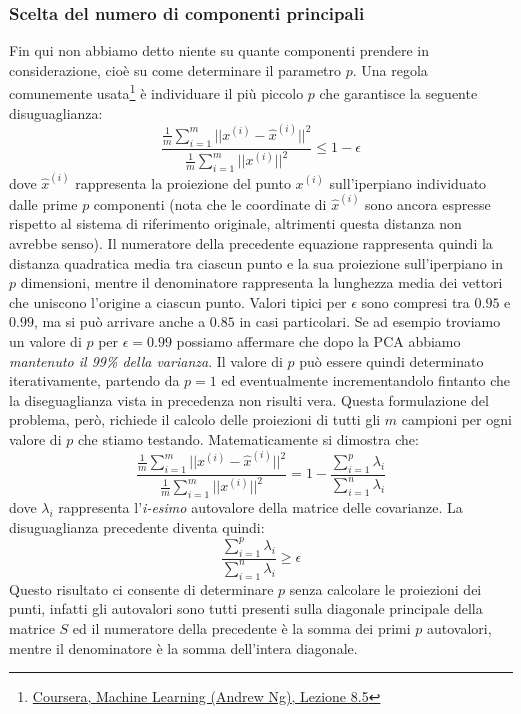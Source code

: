 \subsubsection{Scelta del numero di componenti principali}\label{scelta-p}
Fin qui non abbiamo detto niente su quante componenti prendere in considerazione, cioè su come determinare il parametro $p$. Una regola comunemente usata\footnote{{\href{https://class.coursera.org/ml-005/lecture/86}{Coursera, Machine Learning (Andrew Ng), Lezione 8.5}}} è individuare il più piccolo $p$ che garantisce la seguente disuguaglianza:
\begin{equation*}
\displaystyle\frac{\displaystyle\frac{1}{m} \sum_{i=1}^m || x^{(i)} - \hat{x}^{(i)}||^2}{\displaystyle\frac{1}{m} \sum_{i=1}^m || x^{(i)}||^2} \leq 1-\epsilon
\end{equation*}
dove $\hat{x}^{(i)}$ rappresenta la proiezione del punto $x^{(i)}$ sull'iperpiano individuato dalle prime $p$ componenti (nota che le coordinate di $\hat{x}^{(i)}$ sono ancora espresse rispetto al sistema di riferimento originale, altrimenti questa distanza non avrebbe senso). Il numeratore della precedente equazione rappresenta quindi la distanza quadratica media tra ciascun punto e la sua proiezione sull'iperpiano in $p$ dimensioni, mentre il denominatore rappresenta la lunghezza media dei vettori che uniscono l'origine a ciascun punto. Valori tipici per $\epsilon$ sono compresi tra $0.95$ e $0.99$, ma si può arrivare anche a $0.85$ in casi particolari. Se ad esempio troviamo un valore di $p$ per $\epsilon = 0.99$ possiamo affermare che dopo la PCA abbiamo \emph{mantenuto il 99\% della varianza}.
Il valore di $p$ può essere quindi determinato iterativamente, partendo da $p=1$ ed eventualmente incrementandolo fintanto che la diseguaglianza vista in precedenza non risulti vera. Questa formulazione del problema, però, richiede il calcolo delle proiezioni di tutti gli $m$ campioni per ogni valore di $p$ che stiamo testando. Matematicamente si dimostra che:
\begin{equation*}
\displaystyle\frac{\displaystyle\frac{1}{m} \sum_{i=1}^m || x^{(i)} - \hat{x}^{(i)}||^2}{\displaystyle\frac{1}{m} \sum_{i=1}^m || x^{(i)}||^2} = 1 - \displaystyle\frac{\displaystyle\sum_{i=1}^p \lambda_i}{\displaystyle\sum_{i=1}^n \lambda_i}
\end{equation*}
dove $\lambda_i$ rappresenta l'\emph{i-esimo} autovalore della matrice delle covarianze. La disuguaglianza precedente diventa quindi:
\begin{equation*}
\displaystyle\frac{\displaystyle\sum_{i=1}^p \lambda_i}{\displaystyle\sum_{i=1}^n \lambda_i} \geq \epsilon
\end{equation*}
Questo risultato ci consente di determinare $p$ senza calcolare le proiezioni dei punti, infatti gli autovalori sono tutti presenti sulla diagonale principale della matrice $S$ ed il numeratore della precedente è la somma dei primi $p$ autovalori, mentre il denominatore è la somma dell'intera diagonale.

